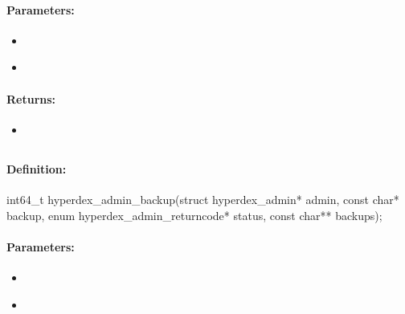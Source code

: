 \paragraph{Parameters:}
\begin{itemize}[noitemsep]
\item {}\\

\item {}\\

\end{itemize}

\paragraph{Returns:}
\begin{itemize}[noitemsep]
\item {}\\

\end{itemize}

\pagebreak
\subsection{}
\label{api:c:backup}


\paragraph{Definition:}
\begin{ccode}
int64_t hyperdex_admin_backup(struct hyperdex_admin* admin,
        const char* backup,
        enum hyperdex_admin_returncode* status,
        const char** backups);
\end{ccode}

\paragraph{Parameters:}
\begin{itemize}[noitemsep]
\item {}\\

\item {}\\

\end{itemize}

